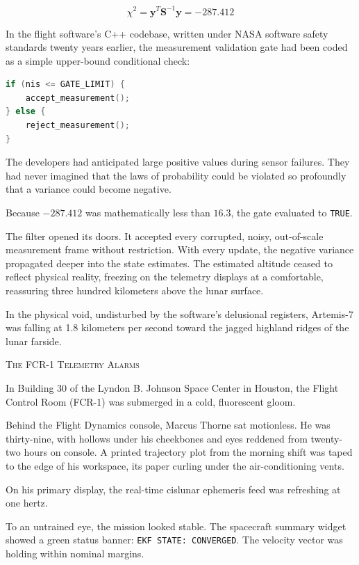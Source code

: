 \documentclass[12pt,twoside,openright]{book}
\newcommand{\sceneheader}[1]{%
  \par\vspace{1.8em}%
  {\noindent\centering\scshape\large #1\par}%
  \vspace{1.0em}%
  \noindent%
}
\newcommand{\dinkus}{%
  \par\vspace{1.2em}%
  {\noindent\centering{\large $\ast\quad\ast\quad\ast$}\par}%
  \vspace{1.2em}%
  \noindent%
}
\begin{document}
\[\chi^2 = \mathbf{y}^T \mathbf{S}^{-1} \mathbf{y} = -287.412\]

In the flight software's C++ codebase, written under NASA software
safety standards twenty years earlier, the measurement validation gate
had been coded as a simple upper-bound conditional check:

\begin{lstlisting}[language=C]
if (nis <= GATE_LIMIT) {
    accept_measurement();
} else {
    reject_measurement();
}
\end{lstlisting}

The developers had anticipated large positive values during sensor
failures. They had never imagined that the laws of probability could be
violated so profoundly that a variance could become negative.

Because \(-287.412\) was mathematically less than \(16.3\), the gate
evaluated to \passthrough{\lstinline!TRUE!}.

The filter opened its doors. It accepted every corrupted, noisy,
out-of-scale measurement frame without restriction. With every update,
the negative variance propagated deeper into the state estimates. The
estimated altitude ceased to reflect physical reality, freezing on the
telemetry displays at a comfortable, reassuring three hundred kilometers
above the lunar surface.

In the physical void, undisturbed by the software's delusional
registers, Artemis-7 was falling at 1.8 kilometers per second toward the
jagged highland ridges of the lunar farside.

\dinkus

\sceneheader{The FCR-1 Telemetry
Alarms}

In Building 30 of the Lyndon B. Johnson Space Center in Houston, the
Flight Control Room (FCR-1) was submerged in a cold, fluorescent gloom.

Behind the Flight Dynamics console, Marcus Thorne sat motionless. He was
thirty-nine, with hollows under his cheekbones and eyes reddened from
twenty-two hours on console. A printed trajectory plot from the morning
shift was taped to the edge of his workspace, its paper curling under
the air-conditioning vents.

On his primary display, the real-time cislunar ephemeris feed was
refreshing at one hertz.

To an untrained eye, the mission looked stable. The spacecraft summary
widget showed a green status banner:
\passthrough{\lstinline!EKF STATE: CONVERGED!}. The velocity vector was
holding within nominal margins.
\end{document}
